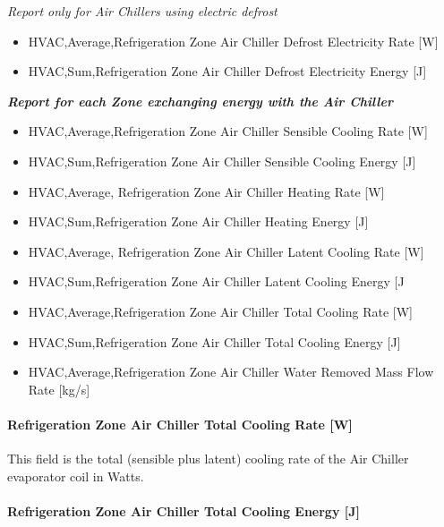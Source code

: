 \emph{Report only for Air Chillers using electric defrost}

\begin{itemize}
\item
  HVAC,Average,Refrigeration Zone Air Chiller Defrost Electricity Rate {[}W{]}
\item
  HVAC,Sum,Refrigeration Zone Air Chiller Defrost Electricity Energy {[}J{]}
\end{itemize}

\textbf{\emph{Report for each Zone exchanging energy with the Air Chiller}}

\begin{itemize}
\item
  HVAC,Average,Refrigeration Zone Air Chiller Sensible Cooling Rate {[}W{]}
\item
  HVAC,Sum,Refrigeration Zone Air Chiller Sensible Cooling Energy {[}J{]}
\item
  HVAC,Average, Refrigeration Zone Air Chiller Heating Rate {[}W{]}
\item
  HVAC,Sum,Refrigeration Zone Air Chiller Heating Energy {[}J{]}
\item
  HVAC,Average, Refrigeration Zone Air Chiller Latent Cooling Rate {[}W{]}
\item
  HVAC,Sum,Refrigeration Zone Air Chiller Latent Cooling Energy {[}J
\item
  HVAC,Average,Refrigeration Zone Air Chiller Total Cooling Rate {[}W{]}
\item
  HVAC,Sum,Refrigeration Zone Air Chiller Total Cooling Energy {[}J{]}
\item
  HVAC,Average,Refrigeration Zone Air Chiller Water Removed Mass Flow Rate {[}kg/s{]}
\end{itemize}

\paragraph{Refrigeration Zone Air Chiller Total Cooling Rate {[}W{]}}\label{refrigeration-zone-air-chiller-total-cooling-rate-w-1}

This field is the total (sensible plus latent) cooling rate of the Air Chiller evaporator coil in Watts.

\paragraph{Refrigeration Zone Air Chiller Total Cooling Energy {[}J{]}}\label{refrigeration-zone-air-chiller-total-cooling-energy-j}

